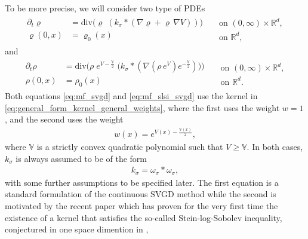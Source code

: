 \documentclass[reqno, 11pt]{amsart}
\numberwithin{equation}{section}
\theoremstyle{definition}
\begin{document}
    To be more precise, we will consider two type of PDEs
    \begin{align}
        \label{eq:mf_svgd}
        \begin{split}
            \partial_t \varrho&=\mathrm{div}\Big(\varrho\;  (k_\sigma\ast (\nabla \varrho+\varrho\,\nabla V))\Big)\\
            \varrho(0,x) &= \varrho_0(x)
        \end{split}
        \begin{split}
            & \mbox{ on } (0,\infty) \times \mathbb{R}^{d}, \\
            &\mbox{ on }\mathbb{R}^{d},
        \end{split}
    \end{align}
    and
    \begin{align}
        \label{eq:mf_slsi_svgd}
        \begin{split}
            \partial_t \rho&=\mathrm{div}\Big(\rho\; e^{V-\frac{\mathbb{V}}{2}}\; \big(k_\sigma\ast (\nabla \left( \rho\, e^{V} \right) e^{-\frac{\mathbb{V}}{2}})\big)\Big)\\
            \rho(0,x) &= \rho_0(x)
        \end{split}
        \begin{split}
            & \mbox{ on } (0,\infty) \times \mathbb{R}^{d}, \\
            &\mbox{ on }\mathbb{R}^{d}.
        \end{split}
    \end{align}
    Both equations \eqref{eq:mf_svgd} and \eqref{eq:mf_slsi_svgd} use the kernel in \eqref{eq:general_form_kernel_general_weights}, where the first uses the weight $w=1$, and the second uses the weight
    \begin{align}
        \label{eq:slsi_weight}
        w(x)=e^{V(x)-\frac{\mathbb{V}(x)}{2}},
    \end{align}
    where $\mathbb{V}$ is a strictly convex quadratic polynomial such that $V\geq \mathbb{V}$. In both cases, $k_\sigma$ is always assumed to be of the form
    \begin{align*}
        k_\sigma = \omega_\sigma\ast\omega_\sigma,
    \end{align*}
    with some further assumptions to be specified later. The first equation is a standard formulation of the continuous SVGD method \cite{lu_lu_nolen_2019_scaling,duncan_nusken_szpruch_2023_geometry,liu_2017_stein} while the second is motivated by the recent paper \cite{carrillo_skrzeczkowski_warnett_2024_stein} which has proven for the very first time the existence of a kernel that satisfies the so-called Stein-log-Sobolev inequality, conjectured in one space dimention in \cite{duncan_nusken_szpruch_2023_geometry},
\end{document}
